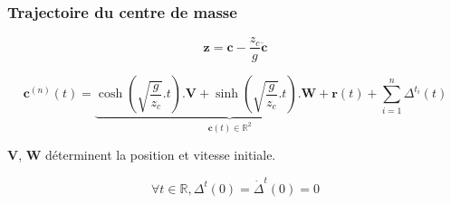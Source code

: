 \documentclass[14pt,utf8x,hyperref={pdfpagelabels=false}]{beamer}
\begin{document}
\begin{slideAction}
  \frametitle{Trajectoire du centre de masse}

  \begin{equation*}
    \mathbf{z} = \mathbf{c} - \frac{z_c}{g} \ddot{\mathbf{c}}
  \end{equation*}

  \begin{equation*}
    \mathbf{c}^{(n)}(t) =
    \underbrace{\scriptstyle \cosh(\sqrt{\frac{g}{z_c}}.t) . \mathbf{V} +
      \sinh(\sqrt{\frac{g}{z_c}}.t) . \mathbf{W} +
      \mathbf{r}(t)}_{\mathbf{c}(t) \in \mathbb{R}^2} + \sum_{i=1}^n \Delta^{t_i}(t)
  \end{equation*}

  \begin{center}
    $\mathbf{V}$, $\mathbf{W}$ déterminent la position et vitesse
    initiale.
  \end{center}

  \begin{equation*}
    \forall t \in \mathbb{R}, \Delta^t(0) = \dot{\Delta}^t(0) = 0
  \end{equation*}
\end{slideAction}


\end{document}

